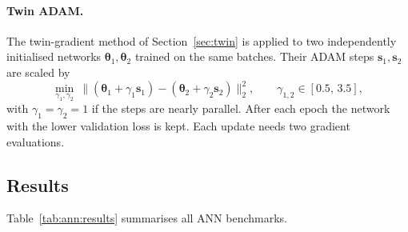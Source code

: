 \documentclass[11pt,a4paper]{article}
\begin{document}
\paragraph{Twin ADAM.}
The twin-gradient method of Section~\ref{sec:twin} \cite{demagistris2026twin} is applied to two independently initialised networks $\bm{\theta}_1,\bm{\theta}_2$ trained on the same batches. Their ADAM steps $\bm{s}_1,\bm{s}_2$ are scaled by
\begin{equation}
  \min_{\gamma_1,\gamma_2}\ \big\| (\bm{\theta}_1 + \gamma_1\bm{s}_1) - (\bm{\theta}_2 + \gamma_2\bm{s}_2) \big\|_2^2 ,
  \qquad \gamma_{1,2}\in[0.5,\,3.5],
\end{equation}
with $\gamma_1=\gamma_2=1$ if the steps are nearly parallel. After each epoch the network with the lower validation loss is kept. Each update needs two gradient evaluations.

\FloatBarrier
\subsection{Results}
\label{sec:ann:results}
Table~\ref{tab:ann:results} summarises all ANN benchmarks.
\end{document}
